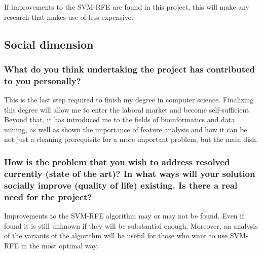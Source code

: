 If improvements to the SVM-RFE are found in this project, this will make any re\-search that makes use of less expensive.

\subsection{Social dimension}

\subsubsection*{What do you think undertaking the project has contributed to you personally?}

This is the last step required to finish my degree in computer science. Finalizing this degree will allow me to enter the laboral market and become self-sufficient. Beyond that, it has introduced me to the fields of bioinformatics and data mining, as well as shown the importance of feature analysis and how it can be not just a cleaning prerequisite for a more important problem, but the main dish. 

\subsubsection*{How is the problem that you wish to address resolved currently (state of the art)? In what ways will your solution socially improve (quality of life) existing. Is there a real need for the project?}

Improvements to the SVM-RFE algorithm may or may not be found. Even if found it is still unknown if they will be substantial enough. Moreover, an analysis of the variants of the algorithm will be useful for those who want to use SVM-RFE in the most optimal way.
